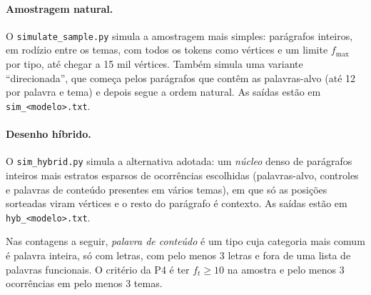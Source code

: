 \documentclass[11pt,a4paper]{article}
\newcommand{\cod}[1]{\texttt{#1}}              %
\begin{document}
\paragraph{Amostragem natural.} O \cod{simulate\_sample.py} simula a amostragem mais simples:
parágrafos inteiros, em rodízio entre os temas, com todos os tokens como vértices e um limite
$f_{\max}$ por tipo, até chegar a 15 mil vértices. Também simula uma variante
``direcionada'', que começa pelos parágrafos que contêm as palavras-alvo (até 12 por palavra e
tema) e depois segue a ordem natural. As saídas estão em \cod{sim\_<modelo>.txt}.

\paragraph{Desenho híbrido.} O \cod{sim\_hybrid.py} simula a alternativa adotada: um
\emph{núcleo} denso de parágrafos inteiros mais estratos esparsos de ocorrências escolhidas
(palavras-alvo, controles e palavras de conteúdo presentes em vários temas), em que só as
posições sorteadas viram vértices e o resto do parágrafo é contexto. As saídas estão em
\cod{hyb\_<modelo>.txt}.

Nas contagens a seguir, \emph{palavra de conteúdo} é um tipo cuja categoria mais comum é
palavra inteira, só com letras, com pelo menos 3 letras e fora de uma lista de palavras
funcionais. O critério da P4 é ter $f_t\ge10$ na amostra e pelo menos 3 ocorrências em pelo
menos 3 temas.
\end{document}
